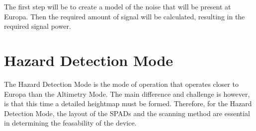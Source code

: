 \documentclass{article}
\begin{document}
The first step will be to create a model of the noise that will be present at Europa. Then the required amount of signal will be calculated, resulting in the required signal power. 



% 



%

\clearpage
\section{Hazard Detection Mode}\label{sec:hazard_detection_mode}
The Hazard Detection Mode is the mode of operation that operates closer to Europa than the Altimetry Mode. The main difference and challenge is however, is that this time a detailed heightmap must be formed. Therefore, for the Hazard Detection Mode, the layout of the SPADs and the scanning method are essential in determining the feasability of the device. 






%


%
\end{document}
